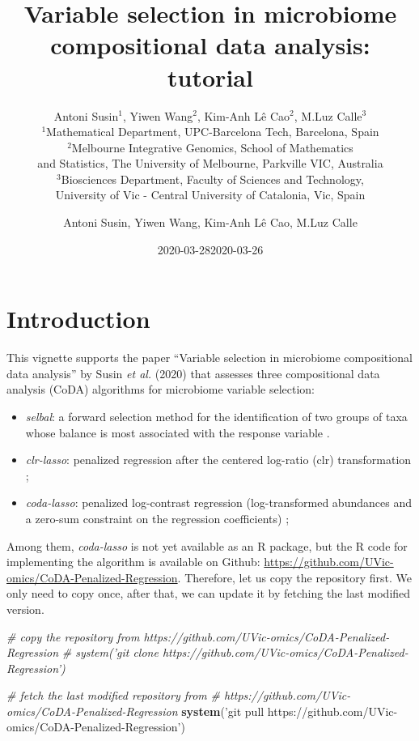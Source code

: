 \documentclass[openany]{book}
\title{Variable selection in microbiome compositional data analysis: tutorial}
\author{Antoni Susin\(^1\), Yiwen Wang\(^2\), Kim-Anh Lê Cao\(^2\), M.Luz
Calle\(^3\)\\
\(^1\)Mathematical Department, UPC-Barcelona Tech, Barcelona, Spain\\
\(^2\)Melbourne Integrative Genomics, School of Mathematics\\
and Statistics, The University of Melbourne, Parkville VIC, Australia\\
\(^3\)Biosciences Department, Faculty of Sciences and Technology,\\
University of Vic - Central University of Catalonia, Vic, Spain}
\date{2020-03-28}
\author{Antoni Susin, Yiwen Wang, Kim-Anh Lê Cao, M.Luz Calle}
\date{2020-03-26}
\newenvironment{Shaded}{\begin{snugshade}}{\end{snugshade}}
\newcommand{\KeywordTok}[1]{\textcolor[rgb]{0.13,0.29,0.53}{\textbf{#1}}}
\newcommand{\StringTok}[1]{\textcolor[rgb]{0.31,0.60,0.02}{#1}}
\newcommand{\CommentTok}[1]{\textcolor[rgb]{0.56,0.35,0.01}{\textit{#1}}}
\newcommand{\NormalTok}[1]{#1}
\providecommand{\tightlist}{%
  \setlength{\itemsep}{0pt}\setlength{\parskip}{0pt}}
\begin{document}
\maketitle

{
\hypersetup{linkcolor=black}
\setcounter{tocdepth}{3}
\tableofcontents
}
\chapter{Introduction}\label{introduction}

This vignette supports the paper ``Variable selection in microbiome
compositional data analysis'' by Susin \emph{et al.} (2020) that
assesses three compositional data analysis (CoDA) algorithms for
microbiome variable selection:

\begin{itemize}
\tightlist
\item
  \emph{selbal}: a forward selection method for the identification of
  two groups of taxa whose balance is most associated with the response
  variable \citep{rivera2018balances}.
\item
  \emph{clr-lasso}: penalized regression after the centered log-ratio
  (clr) transformation
  \citep{zou2005regularization, tibshirani1996regression, le1992ridge};
\item
  \emph{coda-lasso}: penalized log-contrast regression (log-transformed
  abundances and a zero-sum constraint on the regression coefficients)
  \citep{lu2019generalized, lin2014variable};
\end{itemize}

Among them, \emph{coda-lasso} is not yet available as an R package, but
the R code for implementing the algorithm is available on Github:
\url{https://github.com/UVic-omics/CoDA-Penalized-Regression}.
Therefore, let us copy the repository first. We only need to copy once,
after that, we can update it by fetching the last modified version.

\begin{Shaded}
\begin{Highlighting}[]
\CommentTok{# copy the repository from https://github.com/UVic-omics/CoDA-Penalized-Regression}
\CommentTok{# system('git clone https://github.com/UVic-omics/CoDA-Penalized-Regression')}

\CommentTok{# fetch the last modified repository from }
\CommentTok{# https://github.com/UVic-omics/CoDA-Penalized-Regression}
\KeywordTok{system}\NormalTok{(}\StringTok{'git pull https://github.com/UVic-omics/CoDA-Penalized-Regression'}\NormalTok{)}
\end{Highlighting}
\end{Shaded}
\end{document}
